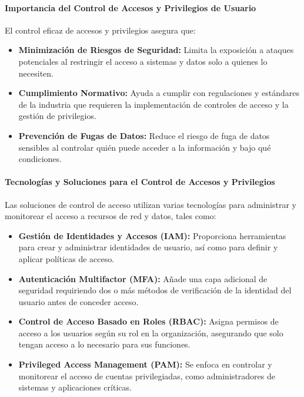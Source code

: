 \paragraph{Importancia del Control de Accesos y Privilegios de Usuario}

El control eficaz de accesos y privilegios asegura que:

\begin{itemize}
    \item \textbf{Minimización de Riesgos de Seguridad:} Limita la exposición a ataques potenciales al restringir el acceso a sistemas y datos solo a quienes lo necesiten.
    \item \textbf{Cumplimiento Normativo:} Ayuda a cumplir con regulaciones y estándares de la industria que requieren la implementación de controles de acceso y la gestión de privilegios.
    \item \textbf{Prevención de Fugas de Datos:} Reduce el riesgo de fuga de datos sensibles al controlar quién puede acceder a la información y bajo qué condiciones.
\end{itemize}

\paragraph{Tecnologías y Soluciones para el Control de Accesos y Privilegios}

Las soluciones de control de acceso utilizan varias tecnologías para administrar y monitorear el acceso a recursos de red y datos, tales como:

\begin{itemize}
    \item \textbf{Gestión de Identidades y Accesos (IAM):} Proporciona herramientas para crear y administrar identidades de usuario, así como para definir y aplicar políticas de acceso.
    \item \textbf{Autenticación Multifactor (MFA):} Añade una capa adicional de seguridad requiriendo dos o más métodos de verificación de la identidad del usuario antes de conceder acceso.
    \item \textbf{Control de Acceso Basado en Roles (RBAC):} Asigna permisos de acceso a los usuarios según su rol en la organización, asegurando que solo tengan acceso a lo necesario para sus funciones.
    \item \textbf{Privileged Access Management (PAM):} Se enfoca en controlar y monitorear el acceso de cuentas privilegiadas, como administradores de sistemas y aplicaciones críticas.
\end{itemize}

